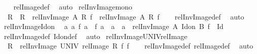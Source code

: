 \begin{isabellebody}
%
\isadelimproof
\ \ %
\endisadelimproof
%
\isatagproof
{}\isamarkupfalse%
\ relImage{\isacharunderscore}{\kern0pt}def\ \isamarkupfalse%
\ auto%
\endisatagproof
{\isafoldproof}%
%
\isadelimproof
\isanewline
%
\endisadelimproof
\isanewline
{}\isamarkupfalse%
\ relInvImage{\isacharunderscore}{\kern0pt}mono{\isacharcolon}{\kern0pt}\isanewline
\ \ {\isachardoublequoteopen}R{}\ {\isasymsubseteq}\ R{}\ {\isasymLongrightarrow}\ relInvImage\ A\ R{}\ f\ {\isasymsubseteq}\ relInvImage\ A\ R{}\ f{\isachardoublequoteclose}\isanewline
%
\isadelimproof
\ \ %
\endisadelimproof
%
\isatagproof
{}\isamarkupfalse%
\ relInvImage{\isacharunderscore}{\kern0pt}def\ \isamarkupfalse%
\ auto%
\endisatagproof
{\isafoldproof}%
%
\isadelimproof
\isanewline
%
\endisadelimproof
\isanewline
{}\isamarkupfalse%
\ relInvImage{\isacharunderscore}{\kern0pt}Id{\isacharunderscore}{\kern0pt}on{\isacharcolon}{\kern0pt}\isanewline
\ \ {\isachardoublequoteopen}{\isacharparenleft}{\kern0pt}{\isasymAnd}a{}\ a{}{\isachardot}{\kern0pt}\ f\ a{}\ {\isacharequal}{\kern0pt}\ f\ a{}\ {\isasymlongleftrightarrow}\ a{}\ {\isacharequal}{\kern0pt}\ a{}{\isacharparenright}{\kern0pt}\ {\isasymLongrightarrow}\ relInvImage\ A\ {\isacharparenleft}{\kern0pt}Id{\isacharunderscore}{\kern0pt}on\ B{\isacharparenright}{\kern0pt}\ f\ {\isasymsubseteq}\ Id{\isachardoublequoteclose}\isanewline
%
\isadelimproof
\ \ %
\endisadelimproof
%
\isatagproof
{}\isamarkupfalse%
\ relInvImage{\isacharunderscore}{\kern0pt}def\ Id{\isacharunderscore}{\kern0pt}on{\isacharunderscore}{\kern0pt}def\ \isamarkupfalse%
\ auto%
\endisatagproof
{\isafoldproof}%
%
\isadelimproof
\isanewline
%
\endisadelimproof
\isanewline
{}\isamarkupfalse%
\ relInvImage{\isacharunderscore}{\kern0pt}UNIV{\isacharunderscore}{\kern0pt}relImage{\isacharcolon}{\kern0pt}\isanewline
\ \ {\isachardoublequoteopen}R\ {\isasymsubseteq}\ relInvImage\ UNIV\ {\isacharparenleft}{\kern0pt}relImage\ R\ f{\isacharparenright}{\kern0pt}\ f{\isachardoublequoteclose}\isanewline
%
\isadelimproof
\ \ %
\endisadelimproof
%
\isatagproof
{}\isamarkupfalse%
\ relInvImage{\isacharunderscore}{\kern0pt}def\ relImage{\isacharunderscore}{\kern0pt}def\ \isamarkupfalse%
\ auto%
\endisatagproof
{\isafoldproof}%
%
\isadelimproof
\isanewline
%
\endisadelimproof
\isanewline
{}\isamarkupfalse%

\end{isabellebody}
